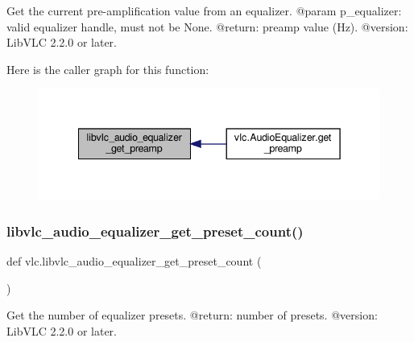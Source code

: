 \begin{DoxyVerb}Get the current pre-amplification value from an equalizer.
@param p_equalizer: valid equalizer handle, must not be None.
@return: preamp value (Hz).
@version: LibVLC 2.2.0 or later.
\end{DoxyVerb}
 Here is the caller graph for this function\+:
\nopagebreak
\begin{figure}[H]
\begin{center}
\leavevmode
\includegraphics[width=342pt]{namespacevlc_a0f558cf51d137d01323634077b0f4b4e_icgraph}
\end{center}
\end{figure}
\mbox{\label{namespacevlc_a8cabffd55794bdd6207aafcebaaba562}} 
\subsubsection{\texorpdfstring{libvlc\+\_\+audio\+\_\+equalizer\+\_\+get\+\_\+preset\+\_\+count()}{libvlc\_audio\_equalizer\_get\_preset\_count()}}
{\footnotesize\ttfamily def vlc.\+libvlc\+\_\+audio\+\_\+equalizer\+\_\+get\+\_\+preset\+\_\+count (\begin{DoxyParamCaption}{ }\end{DoxyParamCaption})}

\begin{DoxyVerb}Get the number of equalizer presets.
@return: number of presets.
@version: LibVLC 2.2.0 or later.
\end{DoxyVerb}
 \mbox{\label{namespacevlc_a77eb7037c0e4a29b89dc541b0fac240d}} 
